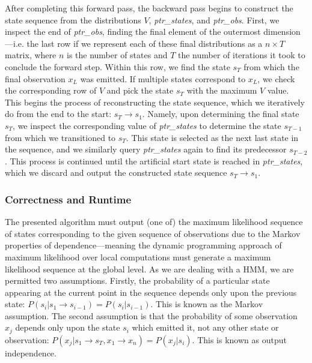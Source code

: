 \documentclass[a4paper, 11pt]{article}
\begin{document}
	After completing this forward pass, the backward pass begins to construct the state sequence from the distributions $V$, \emph{ptr\_states}, and \emph{ptr\_obs}. First, we inspect the end of \emph{ptr\_obs}, finding the final element of the outermost dimension---i.e. the last row if we represent each of these final distributions as a $n \times T$ matrix, where $n$ is the number of states and $T$ the number of iterations it took to conclude the forward step. Within this row, we find the state $s_{T}$ from which the final observation $x_{L}$ was emitted. If multiple states correspond to $x_{L}$, we check the corresponding row of $V$ and pick the state $s_{T}$ with the maximum $V$ value. This begins the process of reconstructing the state sequence, which we iteratively do from the end to the start: $s_{T} \to s_{1}$. Namely, upon determining the final state $s_{T}$, we inspect the corresponding value of \emph{ptr\_states} to determine the state $s_{T-1}$ from which we transitioned to $s_{T}$. This state is selected as the next last state in the sequence, and we similarly query \emph{ptr\_states} again to find its predecessor $s_{T-2}$. This process is continued until the artificial start state is reached in \emph{ptr\_states}, which we discard and output the constructed state sequence $s_{T} \to s_{1}$.
	
	\subsubsection{Correctness and Runtime}
	
	The presented algorithm must output (one of) the maximum likelihood sequence of states corresponding to the given sequence of observations due to the Markov properties of dependence---meaning the dynamic programming approach of maximum likelihood over local computations must generate a maximum likelihood sequence at the global level. As we are dealing with a HMM, we are permitted two assumptions. Firstly, the probability of a particular state appearing at the current point in the sequence depends only upon the previous state: $P \left(s_{i} | s_{1} \to s_{i-1} \right) =  P \left(s_{i} | s_{i-1} \right)$. This is known as the Markov assumption. The second assumption is that the probability of some observation $x_{j}$ depends only upon the state $s_{i}$ which emitted it, not any other state or observation: $P \left(x_{j} | s_{1} \to s_{T},  x_{1} \to x_{n}\right) =  P \left(x_{j} | s_{i} \right)$. This is known as output independence.
		
\end{document}

